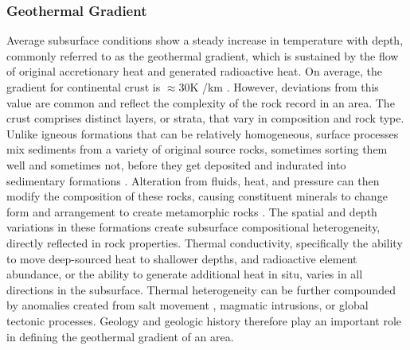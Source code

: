 \subsubsection{Geothermal Gradient}\label{ch2:geotherm}
Average subsurface conditions show a steady increase in temperature with depth, commonly referred to as the geothermal gradient, which is sustained by the flow of original accretionary heat and generated radioactive heat. On average, the gradient for continental crust is $\approx30%
$K%
/km \citep[p.\ 209]{press_understanding_2004}. However, deviations from this value are common and reflect the complexity of the rock record in an area. The crust comprises %
distinct %
layers, or strata, that vary in composition and rock type. Unlike igneous formations that can be relatively homogeneous, surface processes mix sediments from a variety of original source rocks, sometimes sorting them well and sometimes not, before they get deposited and indurated into sedimentary formations \citep[p.\ 164--168]{press_understanding_2004}. Alteration from fluids, heat, and pressure can then modify the composition of these rocks, causing constituent minerals to change form and arrangement to create metamorphic rocks \citep[p.\ 195--205]{press_understanding_2004}. The spatial and depth variations in these formations create subsurface compositional heterogeneity, directly reflected in rock properties. Thermal conductivity, specifically the ability to move deep-sourced heat to shallower depths, and radioactive element abundance, or the ability to generate additional heat in situ, varies in all directions in the subsurface. Thermal heterogeneity can be further compounded by anomalies created from salt movement \citep[p.\ 164--168]{press_understanding_2004}, magmatic intrusions, or global tectonic processes. Geology and geologic history therefore play an important role in defining the geothermal gradient of an area.

